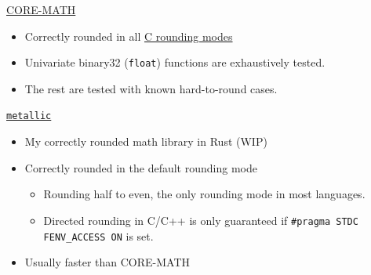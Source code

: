 \documentclass{beamer}
\begin{document}
\begin{frame}{\href{https://core-math.gitlabpages.inria.fr/}{CORE-MATH}}
	\begin{itemize}
		\item Correctly rounded in all \href{https://en.cppreference.com/w/c/numeric/fenv/FE_round}{C rounding modes}
		\item Univariate binary32 (\texttt{float}) functions are exhaustively tested.
		\item The rest are tested with known hard-to-round cases.
	\end{itemize}
\end{frame}

\begin{frame}{\href{https://github.com/jdh8/metallic-rs}{\texttt{metallic}}}
	\begin{itemize}
		\item My correctly rounded math library in Rust (WIP)
		\item Correctly rounded in the default rounding mode
		      \begin{itemize}
			      \item Rounding half to even, the only rounding mode in most languages.
			      \item Directed rounding in C/C++ is only guaranteed if
			            \texttt{\#pragma STDC FENV\_ACCESS ON} is set.
		      \end{itemize}
		\item Usually faster than CORE-MATH
	\end{itemize}
\end{frame}
\end{document}
